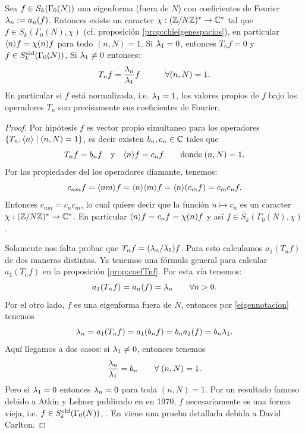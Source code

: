 \begin{prop}\label{thm:valores_propios_Fourier}
	Sea $f\in S_k(\Gamma_0(N))$ una eigenforma (fuera de $N$) con coeficientes de Fourier $\lambda_n:=a_n(f)$. Entonces existe un caracter $\chi:(\mathbb{Z}/N\mathbb{Z})^*\rightarrow\mathbb{C}^*$ tal que $f\in S_k(\Gamma_0(N),\chi)$ (cf. proposición \ref{prop:chieigenespacios}), en particular $\langle n \rangle f=\chi(n)f$ para todo $(n,N)=1$. Si $\lambda_1=0$, entonces $T_nf=0$ y $f\in S_k^{\mathrm{old}}(\Gamma_0(N))$, Si $\lambda_1\neq0$ entonces:
	\[
		T_nf=\frac{\lambda_n}{\lambda_1}f\quad\qquad\forall(n,N)=1.
	\]
	En particular si $f$ está normalizada, i.e. $\lambda_1=1$, los valores propios de $f$ bajo los operadores $T_n$ son precisamente sus coeficientes de Fourier.
\end{prop}
\begin{proof}
  Por hip\'otesis $f$ es vector propio simultaneo para los operadores $\{T_n,\langle n \rangle\mid(n,N)=1\}$,
  es decir existen $b_n,c_n\in\mathbb{C}$ tales que
  \begin{equation}
    \label{eigennotacion}
    T_nf=b_nf\quad\text{y}\quad \langle n \rangle f=c_nf\qquad\text{donde}\;(n,N)=1.
  \end{equation}
  Por las propiedades del los operadores diamante, tenemos:
  \[
    c_{nm}f=\langle nm \rangle f=\langle n \rangle\langle m \rangle f=\langle n \rangle(c_mf)=c_mc_nf.
  \]
  Entonces $c_{nm}=c_nc_m$, lo cual quiere decir que la funci\'on $n\mapsto c_n$ es un caracter
  $\chi:(\mathbb{Z}/N\mathbb{Z})^*\rightarrow\mathbb{C}^*$. En particular $\langle n \rangle f=c_nf=\chi(n)f$ y as\'i
  $f\in S_k(\Gamma_0(N),\chi)$.

  Solamente nos falta probar que $T_nf=(\lambda_n/\lambda_1)f$. Para esto calculamos $a_1(T_nf)$ de dos maneras distintas. Ya tenemos una fórmula general para calcular $a_1(T_nf)$ en la proposici\'on \ref{prop:coefTnf}. Por esta vía tenemos:
  \begin{equation}
    \label{eq:anf}
    a_1(T_nf)=a_n(f)=\lambda_n\qquad\forall n>0.
  \end{equation}
  Por el otro lado, $f$ es una eigenforma fuera de $N$, entonces por \eqref{eigennotacion} tenemos
  \begin{equation}
    \label{eq:anf2}
    \lambda_n=a_1(T_nf)=a_1(b_nf)=b_n a_1(f)=b_n\lambda_1.
  \end{equation}
 Aquí llegamos a dos casos: si $\lambda_1\neq0$, entonces tenemos
  \begin{equation}
    \label{eigenfourier}
    \frac{\lambda_n}{\lambda_1}=b_n \qquad \forall\; (n,N)=1.
  \end{equation}
	Pero si $\lambda_1=0$ entonces $\lambda_n=0$ para toda $(n,N)=1$. Por un resultado famoso debido a Atkin y Lehner publicado en en 1970, $f$ necesariamente es una forma vieja, i.e. $f\in S_k^{\mathrm{old}}(\Gamma_0(N))$, \cite{AtkinLehnerHOOG}. En \cite[\S5.7]{DiamondShurmanAFCIMF} viene una prueba detallada debida a David Carlton.
\end{proof}


